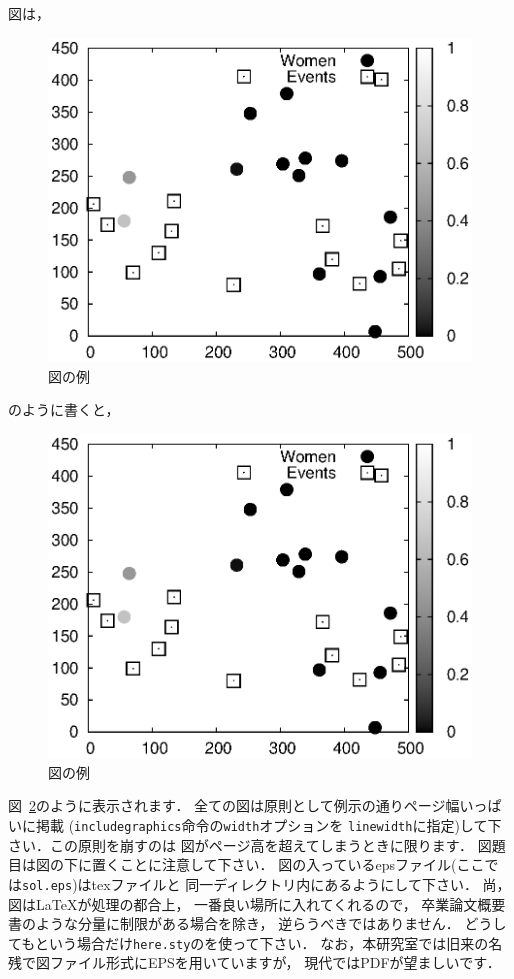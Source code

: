 \documentclass[a4j,12pt,dvipdfmx,oneside]{jsbook}
\theoremstyle{definition}
\begin{document}
図は，
\begin{verbatimtab}
\begin{figure}[htbp]
\centering
\includegraphics[width=\linewidth,clip]{sol.eps}
\caption[図の例]{図の例}
\label{fig:ex}
\end{figure}
\end{verbatimtab}
のように書くと，
\begin{figure}[htbp]
\centering
\includegraphics[width=\linewidth, clip]{sol.eps}
\caption[図の例]{図の例}
\label{fig:ex}
\end{figure}
図~\ref{fig:ex}のように表示されます．
全ての図は原則として例示の通りページ幅いっぱいに掲載
(\texttt{includegraphics}命令の\texttt{width}オプションを
\texttt{linewidth}に指定)して下さい．この原則を崩すのは
図がページ高を超えてしまうときに限ります．
図題目は図の下に置くことに注意して下さい．
図の入っているepsファイル(ここでは\texttt{sol.eps})はtexファイルと
同一ディレクトリ内にあるようにして下さい．
尚，図は\LaTeX{}が処理の都合上，
一番良い場所に入れてくれるので，
卒業論文概要書のような分量に制限がある場合を除き，
逆らうべきではありません．
どうしてもという場合だけ\texttt{here.sty}の\text{[H]}を使って下さい．
なお，本研究室では旧来の名残で図ファイル形式にEPSを用いていますが，
現代ではPDFが望ましいです．
\end{document}
